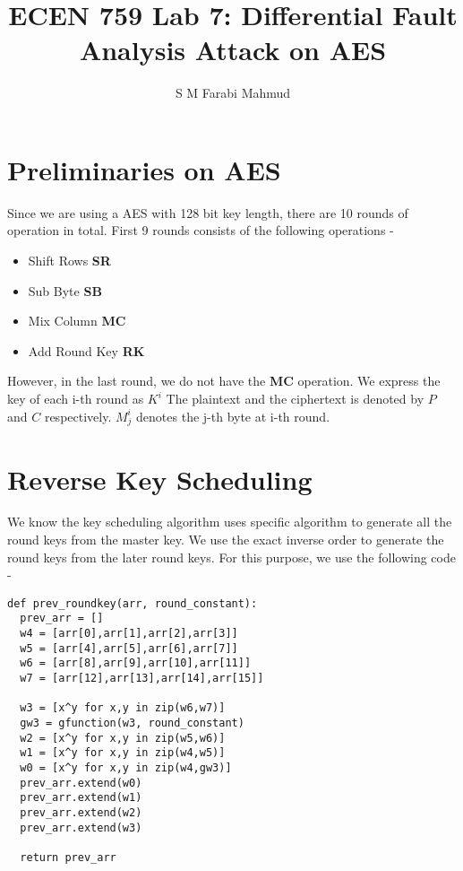 \documentclass{article}
\title{ECEN 759 Lab 7: Differential Fault Analysis Attack on AES}
\author{S M Farabi Mahmud}
\begin{document}
\maketitle
\section{Preliminaries on AES}
Since we are using a AES with 128 bit key length, there are 10 rounds of operation in total. First 9 rounds consists of the following operations - 
\begin{itemize}
	\item Shift Rows \textbf{SR}
	\item Sub Byte \textbf{SB}
	\item Mix Column \textbf{MC}
	\item Add Round Key \textbf{RK}
\end{itemize}
However, in the last round, we do not have the \textbf{MC} operation. 
We express the key of each i-th round as $K^i$ The plaintext and the ciphertext is denoted by $P$ and $C$ respectively. $M^i_j$ denotes the j-th byte at i-th round. 

\section{Reverse Key Scheduling}
We know the key scheduling algorithm uses specific algorithm to generate all the round keys from the master key. We use the exact inverse order to generate the round keys from the later round keys. For this purpose, we use the following code - 
\begin{listing}[H]
	\begin{verbatim}
def prev_roundkey(arr, round_constant):
  prev_arr = []
  w4 = [arr[0],arr[1],arr[2],arr[3]]
  w5 = [arr[4],arr[5],arr[6],arr[7]]
  w6 = [arr[8],arr[9],arr[10],arr[11]]
  w7 = [arr[12],arr[13],arr[14],arr[15]]

  w3 = [x^y for x,y in zip(w6,w7)]
  gw3 = gfunction(w3, round_constant)
  w2 = [x^y for x,y in zip(w5,w6)] 
  w1 = [x^y for x,y in zip(w4,w5)]
  w0 = [x^y for x,y in zip(w4,gw3)]
  prev_arr.extend(w0)
  prev_arr.extend(w1)
  prev_arr.extend(w2)
  prev_arr.extend(w3)

  return prev_arr

	\end{verbatim}
\end{listing}
\end{document}
